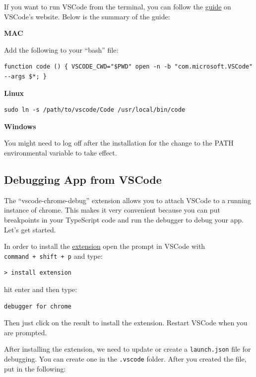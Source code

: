 \documentclass[12pt,]{article}
\begin{document}
If you want to run VSCode from the terminal, you can follow the
\href{https://code.visualstudio.com/Docs/editor/setup}{guide} on
VSCode's website. Below is the summary of the guide:

\textbf{MAC}

Add the following to your ``bash'' file:

\begin{verbatim}
function code () { VSCODE_CWD="$PWD" open -n -b "com.microsoft.VSCode" --args $*; }
\end{verbatim}

\textbf{Linux}

\begin{verbatim}
sudo ln -s /path/to/vscode/Code /usr/local/bin/code
\end{verbatim}

\textbf{Windows}

You might need to log off after the installation for the change to the
PATH environmental variable to take effect.

\subsection{Debugging App from VSCode}\label{debugging-app-from-vscode}

The ``vscode-chrome-debug'' extension allows you to attach VSCode to a
running instance of chrome. This makes it very convenient because you
can put breakpoints in your TypeScript code and run the debugger to
debug your app. Let's get started.

In order to install the
\href{https://github.com/Microsoft/vscode-chrome-debug}{extension} open
the prompt in VSCode with \texttt{command\ +\ shift\ +\ p} and type:

\begin{verbatim}
> install extension
\end{verbatim}

hit enter and then type:

\begin{verbatim}
debugger for chrome
\end{verbatim}

Then just click on the result to install the extension. Restart VSCode
when you are prompted.

After installing the extension, we need to update or create a
\texttt{launch.json} file for debugging. You can create one in the
\texttt{.vscode} folder. After you created the file, put in the
following:
\end{document}
